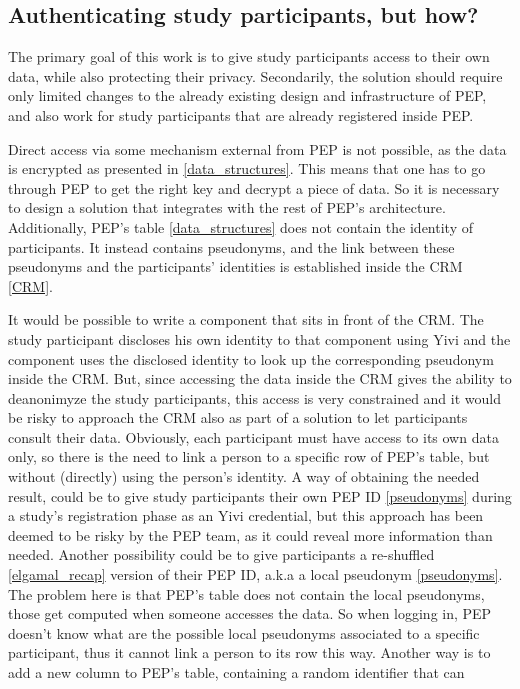 \documentclass{report}
\begin{document}
\subsection{Authenticating study participants, but how?}
The primary goal of this work is to give study participants access to their own data, while also protecting their privacy. Secondarily, the solution should require only limited
changes to the already existing design and infrastructure of PEP, and also work for study participants that are already registered inside PEP.\par
Direct access via some mechanism external from PEP
is not possible, as the data is encrypted as presented in \ref{data_structures}. This means that one has to go through PEP to get the right key and decrypt a piece of data. So it is necessary to design a solution that integrates with the rest of PEP's architecture. Additionally, 
PEP's table \ref{data_structures} does not contain the identity of participants. It instead contains pseudonyms, and the link between these pseudonyms and the participants' identities is 
established inside the CRM \ref{CRM}. \par
It would be possible to write a component that sits in front of the CRM. The study participant discloses his own identity to that component
using Yivi and the component uses the disclosed identity to look up the corresponding pseudonym inside the CRM. But, since accessing the data inside the CRM gives the ability to deanonimyze the study participants, this access is very constrained and it would 
be risky to approach the CRM also as part of a solution to let participants consult their data. Obviously, each participant must have access to its own data only, so there is the
need to link a person to a specific row of PEP's table, but without (directly) using the person's identity. A way of obtaining the needed result, could be to give study participants their own
PEP ID \ref{pseudonyms} during a study's registration phase as an Yivi credential, but this approach has been deemed to be risky by the PEP team, as it could reveal more information
than needed. Another possibility could be to give participants a re-shuffled \ref{elgamal_recap} version of their PEP ID, a.k.a a local pseudonym \ref{pseudonyms}. The problem here is that PEP's
table does not contain the local pseudonyms, those get computed when someone accesses the data. So when logging in, PEP doesn't know what are the possible local pseudonyms
associated to a specific participant, thus it cannot link a person to its row this way. Another way is to add a new column to PEP's table, containing a random identifier that can
\end{document}
